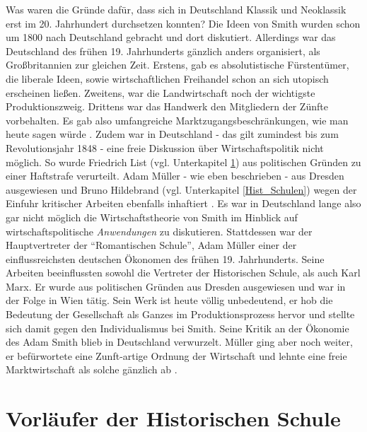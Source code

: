 Was waren die Gründe dafür, dass sich in Deutschland Klassik und Neoklassik erst im 20. Jahrhundert durchsetzen konnten? Die Ideen von Smith wurden schon um 1800 nach Deutschland gebracht und dort diskutiert. Allerdings war das Deutschland des frühen 19. Jahrhunderts gänzlich anders organisiert, als Großbritannien zur gleichen Zeit. Erstens, gab es absolutistische Fürstentümer, die liberale Ideen, sowie wirtschaftlichen Freihandel schon an sich utopisch erscheinen ließen. Zweitens, war die Landwirtschaft noch der wichtigste Produktionszweig. Drittens war das Handwerk den Mitgliedern der Zünfte vorbehalten. Es gab also umfangreiche Marktzugangsbeschränkungen, wie man heute sagen würde \parencite[S. 213f]{Rosner2012}. Zudem war in Deutschland - das gilt zumindest bis zum Revolutionsjahr 1848 - eine freie Diskussion über Wirtschaftspolitik nicht möglich. So wurde Friedrich List (vgl. Unterkapitel \ref{List}) aus politischen Gründen zu einer Haftstrafe verurteilt. Adam Müller - wie eben beschrieben - aus Dresden ausgewiesen und Bruno Hildebrand (vgl. Unterkapitel \ref{Hist_Schulen}) wegen der Einfuhr kritischer Arbeiten ebenfalls inhaftiert \parencite[S. 211]{Rosner2012}. Es war in Deutschland lange also gar nicht möglich die Wirtschaftstheorie von Smith im Hinblick auf wirtschaftspolitische \textit{Anwendungen} zu diskutieren. Stattdessen war der Hauptvertreter der "`Romantischen Schule"', Adam Müller einer der einflussreichsten deutschen Ökonomen des frühen 19. Jahrhunderts. Seine Arbeiten beeinflussten sowohl die Vertreter der Historischen Schule, als auch Karl Marx. Er wurde aus politischen Gründen aus Dresden ausgewiesen und war in der Folge in Wien tätig. Sein Werk ist heute völlig unbedeutend, er hob die Bedeutung der Gesellschaft als Ganzes im Produktionsprozess hervor und stellte sich damit gegen den Individualismus bei Smith. Seine Kritik an der Ökonomie des Adam Smith blieb in Deutschland verwurzelt. Müller ging aber noch weiter, er befürwortete eine Zunft-artige Ordnung der Wirtschaft und lehnte eine freie Marktwirtschaft als solche gänzlich ab \parencite[S. 24ff]{Rosner2012}. 

\section{Vorläufer der Historischen Schule}
\label{List}

